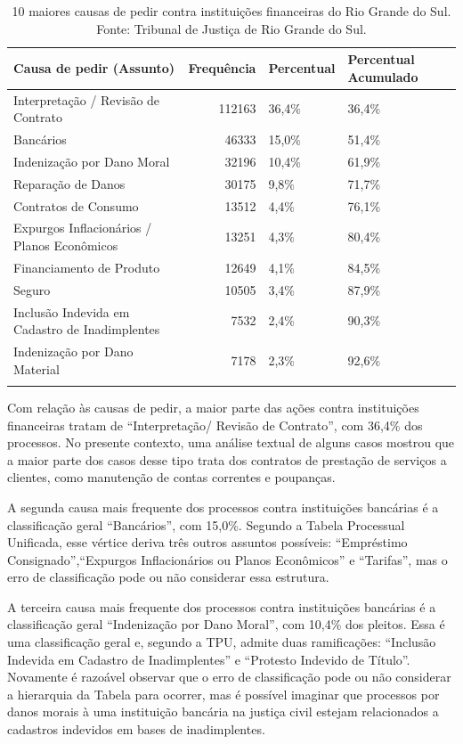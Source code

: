 \documentclass[]{report}
\begin{document}
\begin{longtable}{lrll}
\caption{10 maiores causas de pedir contra instituições financeiras do Rio Grande do Sul. Fonte: Tribunal de Justiça de Rio Grande do Sul.} \\
  \hline
Causa de pedir (Assunto) & Frequência & Percentual & Percentual Acumulado \\
  \hline
Interpretação / Revisão de Contrato & 112163 & 36,4\% & 36,4\% \\
  Bancários & 46333 & 15,0\% & 51,4\% \\
  Indenização por Dano Moral & 32196 & 10,4\% & 61,9\% \\
  Reparação de Danos & 30175 & 9,8\% & 71,7\% \\
  Contratos de Consumo & 13512 & 4,4\% & 76,1\% \\
  Expurgos Inflacionários / Planos Econômicos & 13251 & 4,3\% & 80,4\% \\
  Financiamento de Produto & 12649 & 4,1\% & 84,5\% \\
  Seguro & 10505 & 3,4\% & 87,9\% \\
  Inclusão Indevida em Cadastro de Inadimplentes & 7532 & 2,4\% & 90,3\% \\
  Indenização por Dano Material & 7178 & 2,3\% & 92,6\% \\
   \hline
\hline
\label{unnamed-chunk-9}
\end{longtable}

Com relação às causas de pedir, a maior parte das ações contra
instituições financeiras tratam de ``Interpretação/ Revisão de
Contrato'', com 36,4\% dos processos. No presente contexto, uma análise
textual de alguns casos mostrou que a maior parte dos casos desse tipo
trata dos contratos de prestação de serviços a clientes, como manutenção
de contas correntes e poupanças.

A segunda causa mais frequente dos processos contra instituições
bancárias é a classificação geral ``Bancários'', com 15,0\%. Segundo a
Tabela Processual Unificada, esse vértice deriva três outros assuntos
possíveis: ``Empréstimo Consignado'',``Expurgos Inflacionários ou Planos
Econômicos'' e ``Tarifas'', mas o erro de classificação pode ou não
considerar essa estrutura.

A terceira causa mais frequente dos processos contra instituições
bancárias é a classificação geral ``Indenização por Dano Moral'', com
10,4\% dos pleitos. Essa é uma classificação geral e, segundo a TPU,
admite duas ramificações: ``Inclusão Indevida em Cadastro de
Inadimplentes'' e ``Protesto Indevido de Título''. Novamente é razoável
observar que o erro de classificação pode ou não considerar a hierarquia
da Tabela para ocorrer, mas é possível imaginar que processos por danos
morais à uma instituição bancária na justiça civil estejam relacionados
a cadastros indevidos em bases de inadimplentes.
\end{document}
